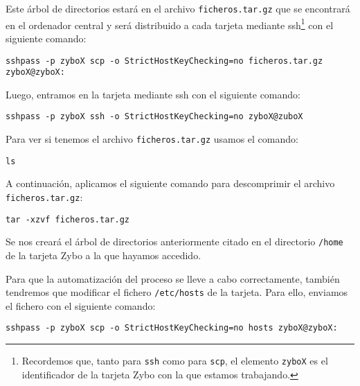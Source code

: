 \documentclass[12pt,letterpaper]{article}
\begin{document}
Este árbol de directorios estará en el archivo \texttt{ficheros.tar.gz} que se encontrará en el ordenador central y será distribuido a cada tarjeta mediante ssh\footnote{Recordemos que, tanto para \texttt{ssh} como para \texttt{scp}, el elemento \texttt{zyboX} es el identificador de la tarjeta Zybo con la que estamos trabajando.} con el siguiente comando:
\begin{center}
	\texttt{sshpass -p zyboX scp -o StrictHostKeyChecking=no ficheros.tar.gz zyboX@zyboX:}
\end{center}

Luego, entramos en la tarjeta mediante ssh con el siguiente comando:
\begin{center}
	\texttt{sshpass -p zyboX ssh -o StrictHostKeyChecking=no zyboX@zuboX}
\end{center}

Para ver si tenemos el archivo \texttt{ficheros.tar.gz} usamos el comando:
\begin{center}
	\texttt{ls}
\end{center}


A continuación, aplicamos el siguiente comando para descomprimir el archivo\\ \texttt{ficheros.tar.gz}:
\begin{center}
	\texttt{tar -xzvf ficheros.tar.gz}
\end{center}

Se nos creará el árbol de directorios anteriormente citado en el directorio \texttt{/home} de la tarjeta Zybo a la que hayamos accedido.

Para que la automatización del proceso se lleve a cabo correctamente, también tendremos que modificar el fichero \texttt{/etc/hosts} de la tarjeta. Para ello, enviamos el fichero con el siguiente comando:
\begin{center}
	\texttt{sshpass -p zyboX scp -o StrictHostKeyChecking=no hosts zyboX@zyboX:}
\end{center}
\end{document}
